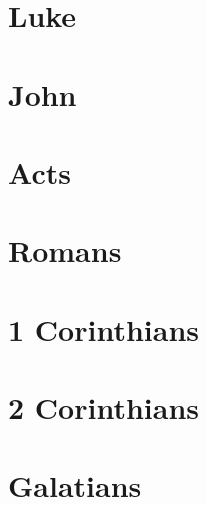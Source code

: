 \chapter{Luke}
\begin{multicols}{2}
  \raggedcolumns
  \parskip=0pt \relax
  
\end{multicols}

\chapter{John}
\begin{multicols}{2}
  \raggedcolumns
  \parskip=0pt \relax
  
\end{multicols}

\chapter{Acts}
\begin{multicols}{2}
  \raggedcolumns
  \parskip=0pt \relax
  
\end{multicols}

\chapter{Romans}
\begin{multicols}{2}
  \raggedcolumns
  \parskip=0pt \relax
  
\end{multicols}

\chapter{1 Corinthians}
\begin{multicols}{2}
  \raggedcolumns
  \parskip=0pt \relax
  
\end{multicols}

\chapter{2 Corinthians}
\begin{multicols}{2}
  \raggedcolumns
  \parskip=0pt \relax
  
\end{multicols}

\chapter{Galatians}
\begin{multicols}{2}
  \raggedcolumns
  \parskip=0pt \relax
  
\end{multicols}

